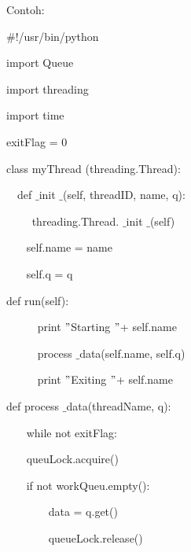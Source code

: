 \noindent 
Contoh: \par
\noindent 
{\fontsize{10pt}{10pt}\selectfont  $  \#  $!/usr/bin/python} \par
\vspace{10pt}
\noindent 
{\fontsize{10pt}{10pt}\selectfont import Queue} \par
\noindent 
{\fontsize{10pt}{10pt}\selectfont import threading} \par
\noindent 
{\fontsize{10pt}{10pt}\selectfont import time} \par
\vspace{10pt}
\noindent 
{\fontsize{10pt}{10pt}\selectfont exitFlag = 0} \par
\vspace{10pt}
\noindent 
{\fontsize{10pt}{10pt}\selectfont class myThread (threading.Thread):} \par
\noindent 
{\fontsize{10pt}{10pt}\selectfont ~~def   $  \_  $init $  \_  $(self, threadID, name, q):} \par
\noindent 
{\fontsize{10pt}{10pt}\selectfont ~~~~ threading.Thread. $  \_  $init $  \_  $(self)} \par
\noindent 
{\fontsize{10pt}{10pt}\selectfont ~~~ self.name = name} \par
\noindent 
{\fontsize{10pt}{10pt}\selectfont ~~~ self.q = q} \par
\noindent 
{\fontsize{10pt}{10pt}\selectfont  def run(self):} \par
\noindent 
{\fontsize{10pt}{10pt}\selectfont ~~~~~ print  $ " $Starting  $ " $+ self.name} \par
\noindent 
{\fontsize{10pt}{10pt}\selectfont ~~~~~ process $  \_  $data(self.name, self.q)} \par
\noindent 
{\fontsize{10pt}{10pt}\selectfont ~~~~~ print  $ " $Exiting  $ " $+ self.name} \par
\vspace{10pt}
\noindent 
{\fontsize{10pt}{10pt}\selectfont def process $  \_  $data(threadName, q):} \par
\noindent 
{\fontsize{10pt}{10pt}\selectfont ~~~ while not exitFlag:} \par
\noindent 
{\fontsize{10pt}{10pt}\selectfont ~~~ queuLock.acquire()} \par
\noindent 
{\fontsize{10pt}{10pt}\selectfont ~~~ if not workQueu.empty():} \par
\noindent 
{\fontsize{10pt}{10pt}\selectfont ~~~~~~~ data = q.get()} \par
\noindent 
{\fontsize{10pt}{10pt}\selectfont ~~~~~~~ queueLock.release()} \par
